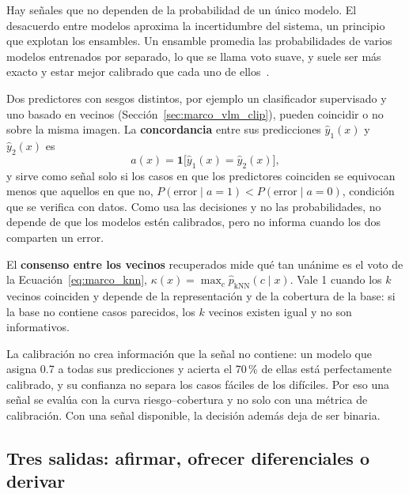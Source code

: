 Hay señales que no dependen de la probabilidad de un único modelo. El desacuerdo entre modelos aproxima la
incertidumbre del sistema, un principio que explotan los ensambles. Un ensamble promedia las probabilidades de
varios modelos entrenados por separado, lo que se llama voto suave, y suele ser más exacto y estar mejor
calibrado que cada uno de ellos~\cite{lakshminarayanan2017simple}.

\label{sec:marco_concordancia}%
Dos predictores con sesgos distintos, por ejemplo un clasificador supervisado y uno basado en vecinos
(Sección~\ref{sec:marco_vlm_clip}), pueden coincidir o no sobre la misma imagen. La \textbf{concordancia} entre
sus predicciones $\hat{y}_1(x)$ y $\hat{y}_2(x)$ es
\begin{equation}
    a(x) = \mathbf{1}\bigl[\hat{y}_1(x) = \hat{y}_2(x)\bigr],
    \label{eq:marco_concordancia}
\end{equation}
y sirve como señal solo si los casos en que los predictores coinciden se equivocan menos que aquellos en que
no, $P(\text{error} \mid a = 1) < P(\text{error} \mid a = 0)$, condición que se verifica con datos. Como usa
las decisiones y no las probabilidades, no depende de que los modelos estén calibrados, pero no informa
cuando los dos comparten un error.

El \textbf{consenso entre los vecinos} recuperados mide qué tan unánime es el voto de la
Ecuación~\ref{eq:marco_knn}, $\kappa(x) = \max_c \hat{p}_{\text{kNN}}(c \mid x)$. Vale 1 cuando los $k$
vecinos coinciden y depende de la representación y de la cobertura de la base: si la base no contiene casos
parecidos, los $k$ vecinos existen igual y no son informativos.

La calibración no crea información que la señal no contiene: un modelo que asigna 0.7 a todas sus
predicciones y acierta el 70\,\% de ellas está perfectamente calibrado, y su confianza no separa los casos
fáciles de los difíciles. Por eso una señal se evalúa con la curva riesgo--cobertura y no solo con una métrica
de calibración. Con una señal disponible, la decisión además deja de ser binaria.

\subsection{Tres salidas: afirmar, ofrecer diferenciales o derivar}
\label{sec:marco_tres_salidas}

